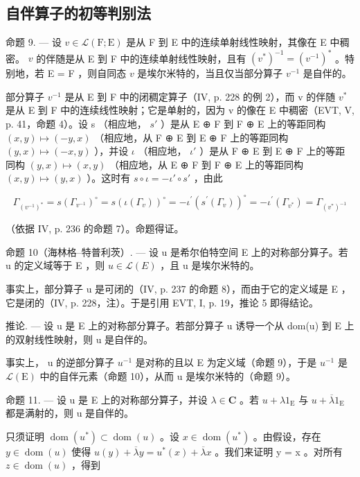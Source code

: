 \subsection{自伴算子的初等判别法}

命题 9. --- 设 \(v \in \mathcal{L}(\mathrm{F};\mathrm{E})\) 是从 F 到 E 中的连续单射线性映射，其像在 E 中稠密。 \(v\) 的伴随是从 E 到 F 中的连续单射线性映射，且有 \((v^{*})^{-1} = (v^{-1})^{*}\) 。特别地，若 E = F ，则自同态 \(v\) 是埃尔米特的，当且仅当部分算子 \(v^{-1}\) 是自伴的。

部分算子 \(v^{-1}\) 是从 E 到 F 中的闭稠定算子（IV, p. 228 的例 2），而 v 的伴随 \(v^{*}\) 是从 E 到 F 中的连续线性映射；它是单射的，因为 v 的像在 E 中稠密（EVT, V, p. 41，命题 4）。设 s （相应地， \(s'\) ）是从 E ⊕ F 到 F ⊕ E 上的等距同构 \((x,y)\mapsto(-y,x)\) （相应地，从 F ⊕ E 到 E ⊕ F 上的等距同构 \((y,x)\mapsto(-x,y)\) ），并设 \(\iota\) （相应地， \(\iota'\) ）是从 F ⊕ E 到 E ⊕ F 上的等距同构 \((y,x)\mapsto(x,y)\) （相应地，从 E ⊕ F 到 F ⊕ E 上的等距同构 \((x,y)\mapsto(y,x)\) ）。这时有 \(s\circ\iota=-\iota'\circ s'\) ，由此

\[
\Gamma_ {(v ^ {- 1}) ^ {*}} = s \left(\Gamma_ {v ^ {- 1}}\right) ^ {\circ} = s \left(\iota \left(\Gamma_ {v}\right)\right) ^ {\circ} = - \iota^ {\prime} \left(s ^ {\prime} \left(\Gamma_ {v}\right)\right) ^ {\circ} = - \iota^ {\prime} \left(\Gamma_ {v ^ {*}}\right) = \Gamma_ {(v ^ {*}) ^ {- 1}}
\]

（依据 IV, p. 236 的命题 7）。命题得证。

命题 10（海林格–特普利茨）. --- 设 u 是希尔伯特空间 E 上的对称部分算子。若 u 的定义域等于 E ，则 \(u \in \mathcal{L}(E)\) ，且 u 是埃尔米特的。

事实上，部分算子 u 是可闭的（IV, p. 237 的命题 8），而由于它的定义域是 E ，它是闭的（IV, p. 228，注）。于是引用 EVT, I, p. 19，推论 5 即得结论。

推论. --- 设 u 是 E 上的对称部分算子。若部分算子 u 诱导一个从 dom(u) 到 E 上的双射线性映射，则 u 是自伴的。

事实上， u 的逆部分算子 \(u^{-1}\) 是对称的且以 E 为定义域（命题 9），于是 \(u^{-1}\) 是 \(\mathcal{L}(\mathrm{E})\) 中的自伴元素（命题 10），从而 u 是埃尔米特的（命题 9）。

命题 11. --- 设 u 是 E 上的对称部分算子，并设 \(\lambda \in \mathbf{C}\) 。若 \(u + \lambda 1_{\mathrm{E}}\) 与 \(u + \overline{\lambda} 1_{\mathrm{E}}\) 都是满射的，则 u 是自伴的。

只须证明 \(\operatorname{dom}(u^{*}) \subset \operatorname{dom}(u)\) 。设 \(x \in \operatorname{dom}(u^{*})\) 。由假设，存在 \(y \in \operatorname{dom}(u)\) 使得 \(u(y) + \overline{\lambda}y = u^{*}(x) + \overline{\lambda}x\) 。我们来证明 y = x 。对所有 \(z \in \operatorname{dom}(u)\) ，得到

